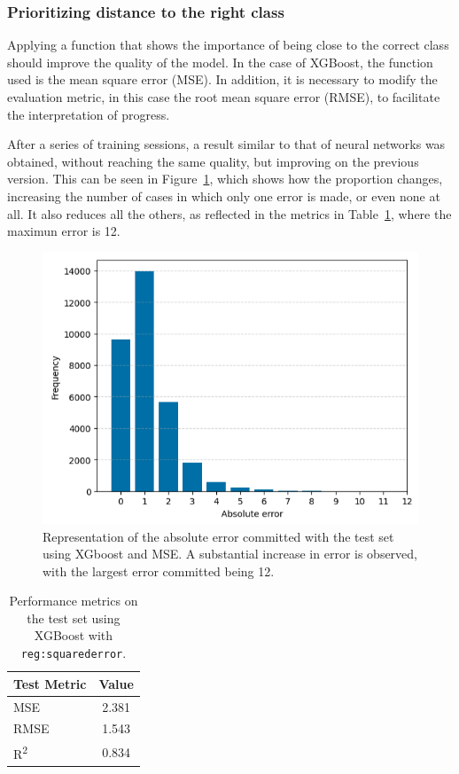 \subsubsection{Prioritizing distance to the right class}

Applying a function that shows the importance of being close to the correct class should improve the quality of the model. In the case of XGBoost, the function used is the mean square error (MSE). In addition, it is necessary to modify the evaluation metric, in this case the root mean square error (RMSE), to facilitate the interpretation of progress.

After a series of training sessions, a result similar to that of neural networks was obtained, without reaching the same quality, but improving on the previous version. This can be seen in Figure~\ref{fig:barplot_xgboost_v2}, which shows how the proportion changes, increasing the number of cases in which only one error is made, or even none at all. It also reduces all the others, as reflected in the metrics in Table~\ref{tab:xgboost_classification_metrics_v2}, where the maximun error is 12.

\begin{figure}[H]
    \centering
    \includegraphics[width=1\textwidth]{figures/xgboost_class/xgboost_class_v2_mse.png}
    \caption{Representation of the absolute error committed with the test set using XGboost and MSE. A substantial increase in error is observed, with the largest error committed being 12.}
    \label{fig:barplot_xgboost_v2}
\end{figure}

\begin{table}[H]
    \centering
    \begin{tabular}{|l|c|}
    \hline
    \textbf{Test Metric} & \textbf{Value} \\
    \hline
    MSE & 2.381 \\
    RMSE & 1.543 \\
    R\textsuperscript{2} & 0.834 \\
    \hline
    \end{tabular}
    \caption{Performance metrics on the test set using XGBoost with \texttt{reg:squarederror}.}
    \label{tab:xgboost_classification_metrics_v2}
\end{table}

